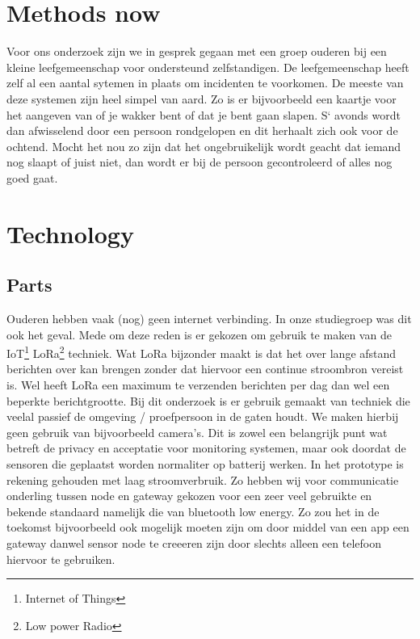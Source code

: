 \documentclass{below-ext}
\begin{document}
\section{Methods now}
Voor ons onderzoek zijn we in gesprek gegaan met een groep ouderen bij een kleine leefgemeenschap voor ondersteund zelfstandigen. De leefgemeenschap heeft zelf al een aantal sytemen in plaats om incidenten te voorkomen. De meeste van deze systemen zijn heel simpel van aard. Zo is er bijvoorbeeld een kaartje voor het aangeven van of je wakker bent of dat je bent gaan slapen. S` avonds wordt dan afwisselend door een persoon rondgelopen en dit herhaalt zich ook voor de ochtend. Mocht het nou zo zijn dat het ongebruikelijk wordt geacht dat iemand nog slaapt of juist niet, dan wordt er bij de persoon gecontroleerd of alles nog goed gaat.\cite{nivel} 
\section{Technology}
\subsection{Parts}
Ouderen hebben vaak (nog) geen internet verbinding. In onze studiegroep was dit ook het geval. Mede om deze reden is er gekozen om gebruik te maken van de IoT\footnote{Internet of Things} LoRa\footnote{Low power Radio} techniek. Wat LoRa bijzonder maakt is dat het over lange afstand berichten over kan brengen zonder dat hiervoor een continue stroombron vereist is. Wel heeft LoRa een maximum te verzenden berichten per dag dan wel een beperkte berichtgrootte. Bij dit onderzoek is er gebruik gemaakt van techniek die veelal passief de omgeving / proefpersoon in de gaten houdt. We maken hierbij geen gebruik van bijvoorbeeld camera's. Dit is zowel een belangrijk punt wat betreft de privacy en acceptatie voor monitoring systemen, maar ook doordat de sensoren die geplaatst worden normaliter op batterij werken. In het prototype is rekening gehouden met laag stroomverbruik. Zo hebben wij voor communicatie onderling tussen node en gateway gekozen voor een zeer veel gebruikte en bekende standaard namelijk die van bluetooth low energy. Zo zou het in de toekomst bijvoorbeeld ook mogelijk moeten zijn om door middel van een app een gateway danwel sensor node te creeeren zijn door slechts alleen een telefoon hiervoor te gebruiken. 
\end{document}
